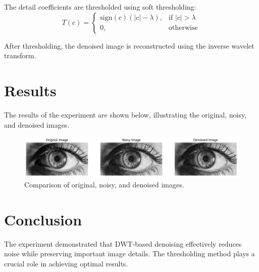 \documentclass{report}
\begin{document}
The detail coefficients are thresholded using soft thresholding:
\begin{equation}
T(c) = 
\begin{cases}
    \text{sign}(c)(|c| - \lambda), & \text{if } |c| > \lambda \\
    0, & \text{otherwise}
\end{cases}
\end{equation}

After thresholding, the denoised image is reconstructed using the inverse wavelet transform.

\section{Results}
The results of the experiment are shown below, illustrating the original, noisy, and denoised images.

\begin{figure}[h]
    \centering
    \includegraphics[width=\textwidth]{images/Exp-9-Results.png}
    \caption{Comparison of original, noisy, and denoised images.}
    \label{fig:denoising_results}
\end{figure}

\section{Conclusion}
The experiment demonstrated that DWT-based denoising effectively reduces noise while preserving important image details. The thresholding method plays a crucial role in achieving optimal results.
\end{document}
